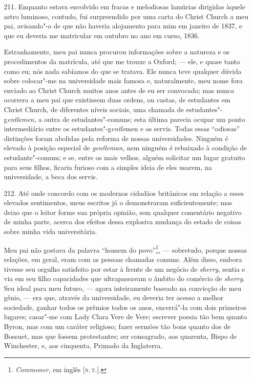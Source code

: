 211. Enquanto estava envolvido em fracas e melodiosas lamúrias dirigidas
àquele astro luminoso, contudo, fui surpreendido por uma carta do Christ
Church a meu pai, avisando"-o de que não haveria alojamento para mim em
janeiro de 1837, e que eu deveria me matricular em outubro no ano em
curso, 1836.

Estranhamente, meu pai nunca procurou informações sobre a natureza e os
procedimentos da matrícula, até que me trouxe a Oxford; --- ele, e quase
tanto como eu; nós nada sabíamos do que se tratava. Ele nunca teve
qualquer dúvida sobre colocar"-me na universidade mais famosa e,
naturalmente, meu nome fora enviado ao Christ Church muitos anos antes
de eu ser convocado; mas nunca ocorrera a meu pai que existissem duas
ordens, ou castas, de estudantes em Christ Church, de diferentes níveis
sociais, uma chamada de estudantes"-g\emph{entlemen,} a outra de
estudantes"-comuns; esta última parecia ocupar um ponto intermediário
entre os estudantes"-g\emph{entle}men e os servis. Todas essas
``odiosas'' distinções foram abolidas pela reforma de nossas
universidades. Ninguém é elevado à posição especial de \emph{gentleman,}
nem ninguém é rebaixado à condição de estudante"-comum; e se, entre os
mais velhos, alguém solicitar um lugar gratuito para seus filhos,
ficaria furioso com a simples ideia de eles usarem, na universidade, a
beca dos servis.

212. Até onde concordo com os modernos cidadãos britânicos em relação a
esses elevados sentimentos, meus escritos já o demonstraram
suficientemente; mas deixo que o leitor forme sua própria opinião, sem
qualquer comentário negativo de minha parte, acerca dos efeitos dessa
explosiva mudança do estado de coisas sobre minha vida universitária.

Meu pai não gostava da palavra ``homem do povo''\footnote{\emph{Commoner,}
  em inglês {[}\textsc{n.\,t.}{]}.}, --- sobretudo, porque nossas relações, em
geral, eram com as pessoas chamadas comuns. Além disso, embora tivesse
seu orgulho satisfeito por estar à frente de um negócio de
\emph{sherry}, sentia e via em seu filho capacidades que ultrapassavam o
âmbito do comércio de \emph{sherry}. Seu ideal para meu futuro, --- agora
inteiramente baseado na convicção de meu gênio, --- era que, através da
universidade, eu deveria ter acesso a melhor sociedade, ganhar todos os
prêmios todos os anos, encerrá"-la com dois primeiros lugares; casar"-me
com Lady Clara Vere de Vere; escrever poesia tão bem quanto Byron, mas
com um caráter religioso; fazer sermões tão bons quanto dos de Bossuet,
mas que fossem protestantes; ser consagrado, aos quarenta, Bispo de
Winchester, e, aos cinquenta, Primado da Inglaterra.


